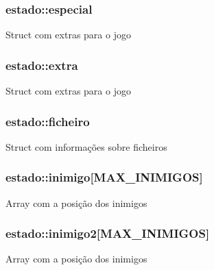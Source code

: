 \subsubsection[{\texorpdfstring{especial}{especial}}]{ estado\+::especial}\hypertarget{structestado_a8e5a5819f7960d012d2fa24bfd730f8d}{}\label{structestado_a8e5a5819f7960d012d2fa24bfd730f8d}
Struct com extras para o jogo 
\subsubsection[{\texorpdfstring{extra}{extra}}]{ estado\+::extra}\hypertarget{structestado_ac30377d2bf33d24a086af42770b858c8}{}\label{structestado_ac30377d2bf33d24a086af42770b858c8}
Struct com extras para o jogo 
\subsubsection[{\texorpdfstring{ficheiro}{ficheiro}}]{ estado\+::ficheiro}\hypertarget{structestado_a922e9490fa436556fe619dad6cd50113}{}\label{structestado_a922e9490fa436556fe619dad6cd50113}
Struct com informações sobre ficheiros 
\subsubsection[{\texorpdfstring{inimigo}{inimigo}}]{ estado\+::inimigo\mbox{[}M\+A\+X\+\_\+\+I\+N\+I\+M\+I\+G\+OS\mbox{]}}\hypertarget{structestado_a8f7d47deb337ae082beab6a574ace9e3}{}\label{structestado_a8f7d47deb337ae082beab6a574ace9e3}
Array com a posição dos inimigos 
\subsubsection[{\texorpdfstring{inimigo2}{inimigo2}}]{ estado\+::inimigo2\mbox{[}M\+A\+X\+\_\+\+I\+N\+I\+M\+I\+G\+OS\mbox{]}}\hypertarget{structestado_a839ea6e060baabcda201827aa29d0c43}{}\label{structestado_a839ea6e060baabcda201827aa29d0c43}
Array com a posição dos inimigos 
